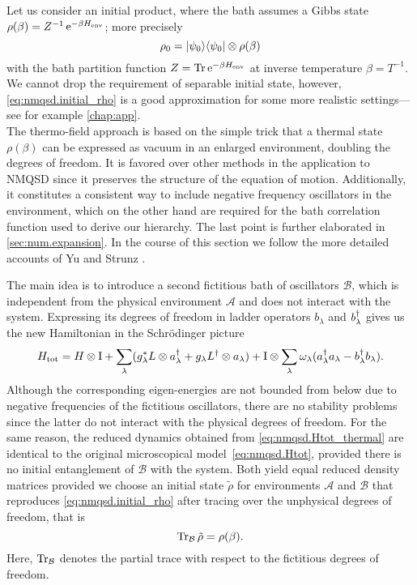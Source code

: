 Let us consider an initial product, where the bath assumes a Gibbs state $\rho(\beta) = Z^{-1} \, \exp[-\beta \Henv]$; more precisely
\begin{equation}
  \rho_0 = | \psi_0 \rangle\langle \psi_0 | \otimes \rho(\beta)
  \label{eq:nmqsd.initial_rho}
\end{equation}
with the bath partition function $Z = \Tr \exp[-\beta \Henv]$ at inverse temperature $\beta = T^{-1}$.
We cannot drop the requirement of separable initial state, however, \autoref{eq:nmqsd.initial_rho} is a good approximation for some more realistic settings---see for example \autoref{chap:app}.\\



The thermo-field approach \cite{} is based on the simple trick that a thermal state $\rho(\beta)$ can be expressed as vacuum in an enlarged environment, doubling the degrees of freedom.
It is favored over other methods in the application to \textsc{NMQSD} since it preserves the structure of the equation of motion.
Additionally, it constitutes a consistent way to include negative frequency oscillators in the environment, which on the other hand are required for the bath correlation function used to derive our hierarchy.
The last point is further elaborated in \autoref{sec:num.expansion}.
In the course of this section we follow the more detailed accounts of Yu and Strunz \cite{Yu04_heat_bath,St01_habil}.

The main idea is to introduce a second fictitious bath of oscillators $\mathcal{B}$, which is independent from the physical environment $\mathcal{A}$ and does not interact with the system.
Expressing its degrees of freedom in ladder operators $b_\lambda$ and $b^\dagger_\lambda$ gives us the new Hamiltonian in the Schrödinger picture
\begin{equation}
  H_\mathrm{tot} = H \otimes \mathrm{I} + \sum_\lambda ({g}^*_\lambda L\otimes a^\dagger_\lambda + g_\lambda L^\dagger\otimes a_\lambda) + \mathrm{I} \otimes \sum_\lambda \omega_\lambda (a^\dagger_\lambda a_\lambda - b^\dagger_\lambda b_\lambda).
  \label{eq:nmqsd.Htot_thermal}
\end{equation}
Although the corresponding eigen-energies are not bounded from below due to negative frequencies of the fictitious oscillators, there are no stability problems since the latter do not interact with the physical degrees of freedom.
For the same reason, the reduced dynamics obtained from \autoref{eq:nmqsd.Htot_thermal} are identical to the original microscopical model~\ref{eq:nmqsd.Htot}, provided there is no initial entanglement of $\mathcal{B}$ with the system.
Both yield equal reduced density matrices provided we choose an initial state $\tilde\rho$ for environments $\mathcal{A}$ and $\mathcal{B}$ that reproduces \autoref{eq:nmqsd.initial_rho} after tracing over the unphysical degrees of freedom, that is
\begin{equation}
  \operatorname{Tr}_\mathcal{B} \tilde\rho = \rho(\beta).
  \label{eq:nmqsd.rho_tilde}
\end{equation}
Here, $\operatorname{Tr}_\mathcal{B}$ denotes the partial trace with respect to the fictitious degrees of freedom.

